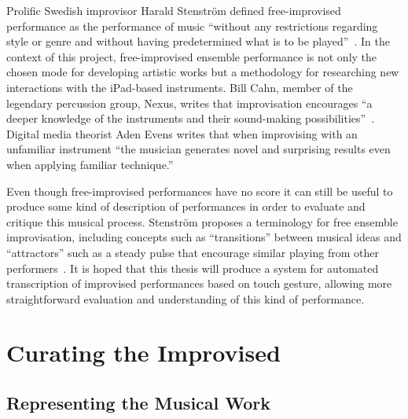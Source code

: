 \documentclass[graybox]{svmult}
\begin{document}
Prolific Swedish improvisor Harald Stenstr\"om defined free-improvised
performance as the performance of music ``without any restrictions
regarding style or genre and without having predetermined what is to
be played''~\cite{Stenstrom:2009xy}. In the context of this project,
free-improvised ensemble performance is not only the chosen mode for
developing artistic works but a methodology for researching new
interactions with the iPad-based instruments. Bill Cahn, member of the
legendary percussion group, Nexus, writes that improvisation
encourages ``a deeper knowledge of the instruments and their
sound-making possibilities''~\cite{Cahn:2005uq}. Digital media
theorist Aden Evens writes that when improvising with an unfamiliar
instrument ``the musician generates novel and surprising results even
when applying familiar technique.''~\cite{Evens:2005kx}

Even though free-improvised performances have no score it can still be
useful to produce some kind of description of performances in order to
evaluate and critique this musical process. Stenstr\"om proposes a
terminology for free ensemble improvisation, including concepts such
as ``transitions'' between musical ideas and ``attractors'' such as a
steady pulse that encourage similar playing from other
performers~\cite{Stenstrom:2009xy}. It is hoped that this thesis will
produce a system for automated transcription of improvised
performances based on touch gesture, allowing more straightforward
evaluation and understanding of this kind of performance.

\section{Curating the Improvised}

\subsection{Representing the Musical Work}
\end{document}
